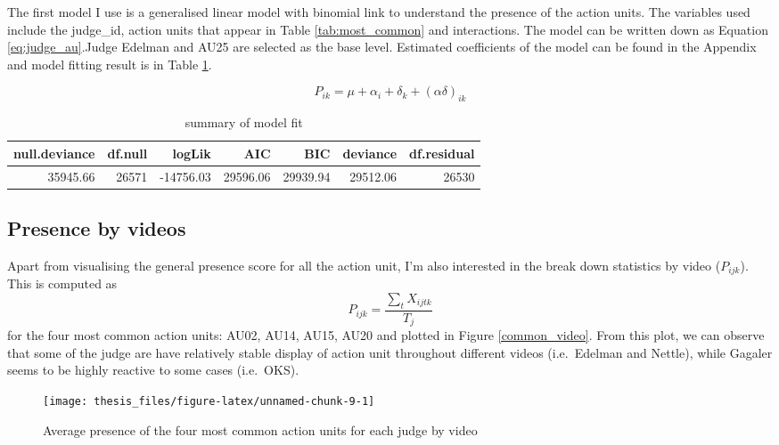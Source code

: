 \documentclass{monashthesis}
\begin{document}
The first model I use is a generalised linear model with binomial link to understand the presence of the action units. The variables used include the judge\_id, action units that appear in Table \ref{tab:most_common} and interactions. The model can be written down as Equation \ref{eq:judge_au}.Judge Edelman and AU25 are selected as the base level. Estimated coefficients of the model can be found in the Appendix and model fitting result is in Table \ref{tab:glance_1}.

\begin{equation}\label{eq:judge_au}
P_{ik} = \mu + \alpha_i + \delta_k + (\alpha\delta)_{ik}
\end{equation}

\begin{table}[t]

\caption{\label{tab:unnamed-chunk-8}\label{tab:glance_1}summary of model fit}
\centering
\begin{tabular}{r|r|r|r|r|r|r}
\hline
null.deviance & df.null & logLik & AIC & BIC & deviance & df.residual\\
\hline
35945.66 & 26571 & -14756.03 & 29596.06 & 29939.94 & 29512.06 & 26530\\
\hline
\end{tabular}
\end{table}

\hypertarget{presence-by-videos}{%
\subsection{Presence by videos}\label{presence-by-videos}}

Apart from visualising the general presence score for all the action unit, I'm also interested in the break down statistics by video (\(P_{ijk}\)). This is computed as \[P_{ijk} = \frac{\sum_{t}X_{ijtk}}{T_j}\] for the four most common action units: AU02, AU14, AU15, AU20 and plotted in Figure \ref{common_video}. From this plot, we can observe that some of the judge are have relatively stable display of action unit throughout different videos (i.e.~Edelman and Nettle), while Gagaler seems to be highly reactive to some cases (i.e.~OKS).

\begin{figure}
\texttt{[image: thesis\_files/figure-latex/unnamed-chunk-9-1]} \caption{Average presence of the four most common action units for each judge by video\label{fig:common_video}}\label{fig:unnamed-chunk-9}
\end{figure}
\end{document}
